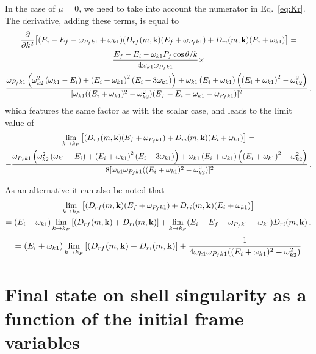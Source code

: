 \documentclass[aps,prd,onecolumn,groupedaddress]{revtex4-2}
\begin{document}
In the case of $\mu=0$, we need to take into account the numerator in Eq.~\eqref{eq:Kr}.
The derivative, adding these terms, is equal to 
\begin{multline}
    \pdv{k^{2}}\qty[(E_i-E_f-\omega_{P_fk1}+\omega_{k1})(D_{rf}(m, \mathbf k)(E_f+\omega_{P_fk1})+ D_{ri}(m, \mathbf k)(E_i+\omega_{k1})]=\\
    \frac{E_f-E_i-\omega_{k1}P_f\cos\theta/k}{4\omega_{k1}\omega_{P_fk1}}
    \times\\
\frac{\omega _{P_fk1}\left(\omega _{k2}^2 \left(\omega _{k1}-E_i\right)+\left(E_i+\omega
   _{k1}\right)^2 \left(E_i+3 \omega _{k1}\right)\right)+\omega _{k1}\left(E_i+\omega
   _{k1}\right) \left(\left(E_i+\omega _{k1}\right)^2-\omega _{k2}^2\right)}{[\omega
   _{k1} ((E_i+\omega _{k1})^2-\omega _{k2}^2)
   (E_f-E_i-\omega _{k1}-\omega _{P_fk1})]^2}\,,
\end{multline}
which features the same factor as with the scalar case, and leads to the limit value of
\begin{multline}
       \lim_{k\to k_P}
    \qty[(D_{rf}(m, \mathbf k)(E_f+\omega_{P_fk1})+ D_{ri}(m, \mathbf k)(E_i+\omega_{k1})]
    =\\ - \frac{\omega _{P_fk1}\left(\omega _{k2}^2 \left(\omega _{k1}-E_i\right)+\left(E_i+\omega
   _{k1}\right)^2 \left(E_i+3 \omega _{k1}\right)\right)+\omega _{k1}\left(E_i+\omega
   _{k1}\right) \left(\left(E_i+\omega _{k1}\right)^2-\omega _{k2}^2\right)}
   {8[\omega_{k1}\omega _{P_fk1} ((E_i+\omega _{k1})^2-\omega _{k2}^2)]^2}\,.
\end{multline}

As an alternative it can also be noted that
\begin{multline}
    \lim_{k\to k_P}
    \qty[(D_{rf}(m, \mathbf k)(E_f+\omega_{P_fk1})+ D_{ri}(m, \mathbf k)(E_i+\omega_{k1})]
    \\= (E_i+\omega_{k1})\lim_{k\to k_P}
    \qty[(D_{rf}(m, \mathbf k)+ D_{ri}(m, \mathbf k)]
    + \lim_{k\to k_P}(E_i-E_f-\omega_{P_fk1}+\omega_{k1})D_{ri}(m, \mathbf k)\,.
\end{multline}
\begin{equation}
    = (E_i+\omega_{k1})\lim_{k\to k_P}
    \qty[(D_{rf}(m, \mathbf k)+ D_{ri}(m, \mathbf k)]
    + \frac{1}{4\omega_{k1}\omega _{P_fk1} ((E_i+\omega _{k1})^2-\omega _{k2}^2)}
\end{equation}




\appendix
\section{Final state on shell singularity as a function of the initial frame variables}
\label{app:fs_sing}
\end{document}
